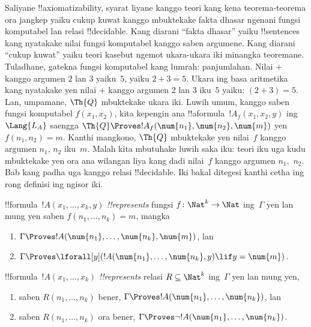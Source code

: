\documentclass[../../../include/open-logic-section]{subfiles}
\begin{document}
Saliyane !!{axiomatizability}, syarat liyane
kanggo teori kang kena teorema-teorema ora
jangkep yaiku cukup kuwat kanggo mbuktekake
fakta dhasar ngenani fungsi komputabel lan
relasi !!{decidable}. Kang diarani ``fakta
dhasar'' yaiku !!{sentence}s kang nyatakake
nilai fungsi komputabel kanggo saben argumene.
Kang diarani ``cukup kuwat'' yaiku teori kasebut
ngemot ukara-ukara iki minangka teoremane.
Tuladhane, gatekna fungsi komputabel kang lumrah:
panjumlahan. Nilai $+$ kanggo argumen $2$
lan $3$ yaiku~$5$, yaiku $2+3 = 5$.
Ukara ing basa aritmetika kang nyatakake yen
nilai $+$ kanggo argumen $2$ lan $3$ iku~$5$
yaiku: $(\num{2} + \num{3}) = \num{5}$.
Lan, umpamane, $\Th{Q}$ mbuktekake ukara iki.
Luwih umum, kanggo saben fungsi komputabel
$f(x_1, x_2)$, kita kepengin ana
!!a{formula}~$!A_f(x_1, x_2, y)$ ing~$\Lang{L_A}$
saengga $\Th{Q} \Proves !A_f(\num{n_1},
\num{n_2}, \num{m})$ yen $f(n_1, n_2) = m$.
Kanthi mangkono, $\Th{Q}$ mbuktekake yen
nilai~$f$ kanggo argumen $n_1$, $n_2$
iku~$m$. Malah kita mbutuhake luwih saka iku:
teori iku uga kudu mbuktekake yen ora ana
wilangan liya kang dadi nilai~$f$ kanggo
argumen $n_1$,~$n_2$. Bab kang padha uga
kanggo relasi !!{decidable}. Iki bakal
ditegesi kanthi cetha ing rong definisi
ing ngisor iki.

\begin{defn}
!!{formula}~$!A(x_1, \dots, x_k, y)$
\emph{!!{represents}} fungsi
$f\colon \Nat^k \to \Nat$ ing~$\Gamma$
yen lan mung yen saben $f(n_1, \dots, n_k) = m$,
mangka
\begin{enumerate}
\item $\Gamma \Proves !A(\num{n_1}, \dots, \num{n_k}, \num{m})$, lan
\item $\Gamma \Proves \lforall[y](!A(\num{n_1}, \dots, \num{n_k},
y) \lif y = \num{m})$.
\end{enumerate}
\end{defn}

\begin{defn}
!!{formula}~$!A(x_1, \dots, x_k)$
\emph{!!{represents}} relasi
$R \subseteq \Nat^k$ ing~$\Gamma$ yen lan mung yen,
\begin{enumerate}
\item saben $R(n_1, \dots, n_k)$ bener,
  $\Gamma \Proves !A(\num{n_1},
\dots, \num{n_k})$, lan
\item saben $R(n_1, \dots, n_k)$ ora bener,
  $\Gamma \Proves \lnot
!A(\num{n_1}, \dots, \num{n_k})$.
\end{enumerate}
\end{defn}
\end{document}
